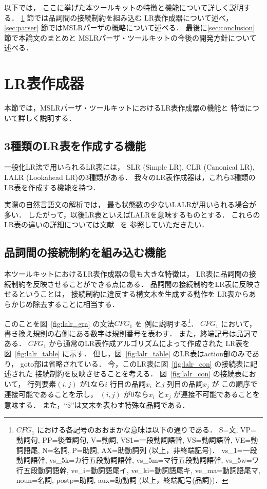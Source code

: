 以下では，
ここに挙げた本ツールキットの特徴と機能について詳しく説明する．
\ref{sec:table generator} 節では品詞間の接続制約を組み込む
LR表作成器について述べ，
\ref{sec:parser} 節ではMSLRパーザの概略について述べる．
最後に\ref{sec:conclusion} 節で本論文のまとめと
MSLRパーザ・ツールキットの今後の開発方針について述べる．
\section{LR表作成器}
\label{sec:table generator}

本節では，MSLRパーザ・ツールキットにおけるLR表作成器の機能と
特徴について詳しく説明する．

\subsection{3種類のLR表を作成する機能}
\label{sec:table type}

一般化LR法で用いられるLR表には，
SLR (Simple LR), CLR (Canonical LR), LALR (Lookahead LR)の3種類がある．
我々のLR表作成器は，これら3種類のLR表を作成する機能を持つ．

実際の自然言語文の解析では，
最も状態数の少ないLALRが用いられる場合が多い．
したがって，以後LR表といえばLALRを意味するものとする．
これらのLR表の違いの詳細については文献~\cite{aho:85:a} を
参照していただきたい．

\subsection{品詞間の接続制約を組み込む機能}
\label{sec:table con}

本ツールキットにおけるLR表作成器の最も大きな特徴は，
LR表に品詞間の接続制約を反映させることができる点にある．
品詞間の接続制約をLR表に反映させるということは，
接続制約に違反する構文木を生成する動作を
LR表からあらかじめ除去することに相当する．

このことを図~\ref{fig:lalr_gra} の文法$CFG_1$ を
例に説明する\footnote{
  $CFG_1$ における各記号のおおまかな意味は以下の通りである．
  S=文,
  VP=動詞句,
  PP=後置詞句,
  V=動詞,
  VS1=一段動詞語幹,
  VS=動詞語幹,
  VE=動詞語尾,
  N=名詞,
  P=助詞,
  AX=助動詞列
  (以上，非終端記号)．
  vs\_1=一段動詞語幹,
  vs\_5k=カ行五段動詞語幹,
  vs\_5m=マ行五段動詞語幹, 
  vs\_5w=ワ行五段動詞語幹,
  ve\_i=動詞語尾イ,
  ve\_ki=動詞語尾キ,
  ve\_ma=動詞語尾マ,
  noun=名詞,
  postp=助詞,
  aux=助動詞
  (以上，終端記号(品詞))．
}．
$CFG_1$ において，
書き換え規則の右側にある数字は規則番号を表わす．
また，終端記号は品詞である．
$CFG_1$ から通常のLR表作成アルゴリズムによって作成された
LR表を図~\ref{fig:lalr_table} に示す．
但し，図~\ref{fig:lalr_table} のLR表はaction部のみであり，
goto部は省略されている．
今，このLR表に図~\ref{fig:lalr_con} の接続表に記述された
接続制約を反映させることを考える．
図~\ref{fig:lalr_con} の接続表において，
行列要素$(i,j)$ が1なら$i$ 行目の品詞$x_i$ と$j$ 列目の品詞$x_j$ が
この順序で連接可能であることを示し，
$(i,j)$ が0なら$x_i$ と$x_j$ が連接不可能であることを意味する．
また，``\$''は文末を表わす特殊な品詞である．


